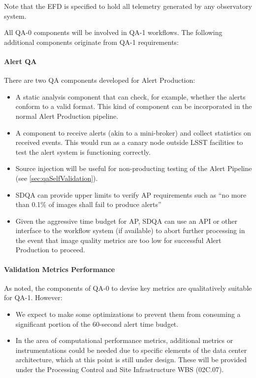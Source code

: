 Note that the EFD is specified to hold all telemetry generated by any observatory system.

All QA-0 components will be involved in QA-1 workflows. The following additional components originate from QA-1 requirements:

\paragraph{Alert QA}
\label{sec:qaAlertQA}

There are two QA components developed for Alert Production:

\begin{itemize}

\item A static analysis component that can check, for example, whether the alerts conform to a valid format. This kind of component can be incorporated in the normal Alert Production pipeline.

\item A component to receive alerts (akin to a mini-broker) and collect statistics on received events. This would run as a canary node outside LSST facilities to test the alert system is functioning correctly.

\item Source injection will be useful for non-producting testing of the Alert Pipeline (see \ref{sec:qaSelfValidation}).

\item SDQA can provide upper limits to verify AP requirements such as ``no more than 0.1\% of images shall fail to produce alerts''

\item Given the aggressive time budget for AP, SDQA can use an API or other interface to the workflow system (if available) to abort further processing in the event that image quality metrics are too low for successful Alert Production to proceed.

\end{itemize}

\paragraph{Validation Metrics Performance}
\label{sec:qaPerfValidate}

As noted, the components of QA-0 to devise key metrics are qualitatively suitable for QA-1. However:

\begin{itemize}

\item We expect to make some optimizations to prevent them from consuming a significant portion of the 60-second alert time budget.

\item In the area of computational performance metrics, additional metrics or instrumentations could be needed due to specific elements of the data center architecture, which at this point is still under design. These will be provided under the Processing Control and Site Infrastructure WBS (02C.07).

\end{itemize}

